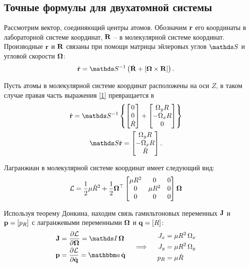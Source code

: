 \subsection{Точные формулы для двухатомной системы}

Рассмотрим вектор, соединяющий центры атомов. Обозначим $\mathbf{r}$ его координаты в лабораторной системе координат, $\mathbf{R}$ -- в молекулярной системе координат. Производные $\mathbf{r}$ и $\mathbf{R}$ связаны при помощи матрицы эйлеровых углов $\bbS$ и угловой скорости $\mathbf{\Omega}$:
\begin{gather}
		\dot{\mf{r}} = \bbS^{-1} \lb \dot{\mf{R}} + \left[ \mf{\Omega} \times \mf{R} \right] \rb. \label{1} 
\end{gather}

Пусть атомы в молекулярной системе координат расположены на оси $Z$, в таком случае правая часть выражения \eqref{1} превращается в 
\begin{gather}
\dot{\mf{r}} = \bbS^{-1} \left\{
\begin{bmatrix}
		0 \\
		0 \\
		\dot{R}
\end{bmatrix}
+
\begin{bmatrix}
		\Omega_y R \\
		- \Omega_x R \\
		0
\end{bmatrix}
\right\} \notag \\
\bbS \dot{\mf{r}} =
\begin{bmatrix}
\Omega_y R \\
- \Omega_x R \\
\dot{R}
\end{bmatrix}. \label{2}
\end{gather}

Лагранжиан в молекулярной системе координат имеет следующий вид:
\begin{gather}
\mathcal{L} = \frac{1}{2} \mu \dot{R}^2 + \frac{1}{2} \mathbf{\Omega}^\top
\begin{bmatrix}
		\mu R^2 & 0 & 0 \\
		0 & \mu R^2 & 0 \\
		0 & 0 & 0
\end{bmatrix}
\mathbf{\Omega} \notag
\end{gather}

Используя теорему Донкина, находим связь гамильтоновых переменных $\mathbf{J}$ и $\mathbf{p} = \left[ p_R \right]$ с лагранжевыми переменными $\mathbf{\Omega}$ и $\mathbf{q} = \left[ R \right]$:
\begin{gather}
\begin{aligned}
\mf{J} &= \frac{\partial \mL}{\partial \mf{\Omega}} = \bbI \, \mf{\Omega} \\
\mf{p} &= \frac{\partial \mL}{\partial \dot{\mf{q}}} = \bba \, \dot{\mf{q}}
\end{aligned}
\quad \implies \quad
\begin{aligned}
		J_x &= \mu R^2 \, \Omega_x \\
		J_y &= \mu R^2 \, \Omega_y \\
		p_R &= \mu \dot{R}
\end{aligned} \label{3}
\end{gather}

